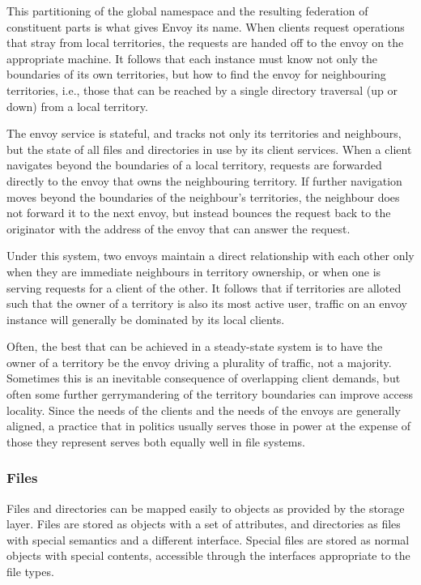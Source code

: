 This partitioning of the global namespace and the resulting federation of constituent parts is what gives Envoy its name. When clients request operations that stray from local territories, the requests are handed off to the envoy on the appropriate machine. It follows that each instance must know not only the boundaries of its own territories, but how to find the envoy for neighbouring territories, i.e., those that can be reached by a single directory traversal (up or down) from a local territory.

The envoy service is stateful, and tracks not only its territories and neighbours, but the state of all files and directories in use by its client services. When a client navigates beyond the boundaries of a local territory, requests are forwarded directly to the envoy that owns the neighbouring territory. If further navigation moves beyond the boundaries of the neighbour's territories, the neighbour does not forward it to the next envoy, but instead bounces the request back to the originator with the address of the envoy that can answer the request.

Under this system, two envoys maintain a direct relationship with each other only when they are immediate neighbours in territory ownership, or when one is serving requests for a client of the other. It follows that if territories are alloted such that the owner of a territory is also its most active user, traffic on an envoy instance will generally be dominated by its local clients.

Often, the best that can be achieved in a steady-state system is to have the owner of a territory be the envoy driving a plurality of traffic, not a majority. Sometimes this is an inevitable consequence of overlapping client demands, but often some further gerrymandering of the territory boundaries can improve access locality. Since the needs of the clients and the needs of the envoys are generally aligned, a practice that in politics usually serves those in power at the expense of those they represent serves both equally well in file systems.

\subsubsection{Files}\label{sec:directory-format}

Files and directories can be mapped easily to objects as provided by the storage layer. Files are stored as objects with a set of attributes, and directories as files with special semantics and a different interface. Special files are stored as normal objects with special contents, accessible through the interfaces appropriate to the file types.

